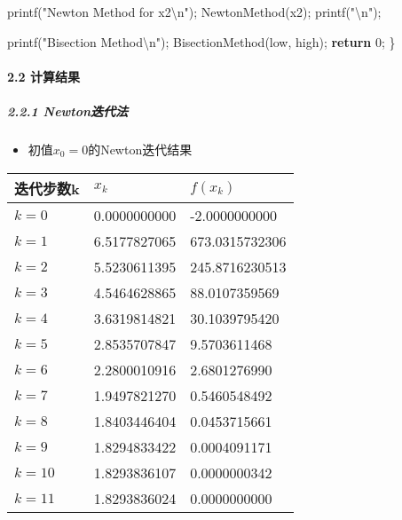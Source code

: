 \documentclass[
]{article}
\newenvironment{Shaded}{}{}
\newcommand{\ControlFlowTok}[1]{\textcolor[rgb]{0.00,0.44,0.13}{\textbf{#1}}}
\newcommand{\DecValTok}[1]{\textcolor[rgb]{0.25,0.63,0.44}{#1}}
\newcommand{\NormalTok}[1]{#1}
\newcommand{\OperatorTok}[1]{\textcolor[rgb]{0.40,0.40,0.40}{#1}}
\newcommand{\SpecialCharTok}[1]{\textcolor[rgb]{0.25,0.44,0.63}{#1}}
\newcommand{\StringTok}[1]{\textcolor[rgb]{0.25,0.44,0.63}{#1}}
\begin{document}
\begin{Shaded}
\begin{Highlighting}[]
\NormalTok{	printf}\OperatorTok{(}\StringTok{"Newton Method for x2}\SpecialCharTok{\textbackslash{}n}\StringTok{"}\OperatorTok{);}
\NormalTok{	NewtonMethod}\OperatorTok{(}\NormalTok{x2}\OperatorTok{);}
\NormalTok{	printf}\OperatorTok{(}\StringTok{"}\SpecialCharTok{\textbackslash{}n}\StringTok{"}\OperatorTok{);}


\NormalTok{	printf}\OperatorTok{(}\StringTok{"Bisection Method}\SpecialCharTok{\textbackslash{}n}\StringTok{"}\OperatorTok{);}
\NormalTok{	BisectionMethod}\OperatorTok{(}\NormalTok{low}\OperatorTok{,}\NormalTok{ high}\OperatorTok{);}
	\ControlFlowTok{return} \DecValTok{0}\OperatorTok{;}
\OperatorTok{\}}
\end{Highlighting}
\end{Shaded}

\hypertarget{22-ux8ba1ux7b97ux7ed3ux679c}{%
\paragraph{2.2 计算结果}\label{22-ux8ba1ux7b97ux7ed3ux679c}}

\hypertarget{221-newtonux8fedux4ee3ux6cd5}{%
\subparagraph{2.2.1 Newton迭代法}\label{221-newtonux8fedux4ee3ux6cd5}}

\begin{itemize}
\item
  初值\(x_0=0\)的Newton迭代结果
\end{itemize}

\begin{longtable}[]{@{}lll@{}}
\toprule
迭代步数k & \(x_k\) & \(f(x_k)\) \\
\midrule
\endhead
\(k=0\) & 0.0000000000 & -2.0000000000 \\
\(k=1\) & 6.5177827065 & 673.0315732306 \\
\(k=2\) & 5.5230611395 & 245.8716230513 \\
\(k=3\) & 4.5464628865 & 88.0107359569 \\
\(k=4\) & 3.6319814821 & 30.1039795420 \\
\(k=5\) & 2.8535707847 & 9.5703611468 \\
\(k=6\) & 2.2800010916 & 2.6801276990 \\
\(k=7\) & 1.9497821270 & 0.5460548492 \\
\(k=8\) & 1.8403446404 & 0.0453715661 \\
\(k=9\) & 1.8294833422 & 0.0004091171 \\
\(k=10\) & 1.8293836107 & 0.0000000342 \\
\(k=11\) & 1.8293836024 & 0.0000000000 \\
\bottomrule
\end{longtable}
\end{document}

